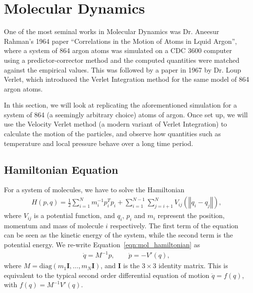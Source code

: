 \documentclass[../Main.tex]{subfiles}
\begin{document}
\section{Molecular Dynamics}

One of the most seminal works in Molecular Dynamics was Dr. Aneesur Rahman's 1964 paper \cite{Rahman1964} ``Correlations in the Motion of Atoms in Lquid Argon'', where a system of 864 argon atoms was simulated on a CDC 3600 computer using a predictor-corrector method and the computed quantities were matched against the empirical values. This was followed by a paper in 1967 \cite{Verlet1967} by Dr. Loup Verlet, which introduced the Verlet Integration method for the same model of 864 argon atoms.

In this section, we will look at replicating the aforementioned simulation for a system of 864 (a seemingly arbitrary choice) atoms of argon. Once set up, we will use the Velocity Verlet method (a modern variant of Verlet Integration) to calculate the motion of the particles, and observe how quantities such as temperature and local pressure behave over a long time period.


\subsection{Hamiltonian Equation}

For a system of molecules, we have to solve the Hamiltonian \cite{Harier2006}
\begin{align}
H(p, q) = \frac{1}{2}\sum_{i = 1}^{N} m_{i}^{-1}p_{i}^{T}p_{i} + \sum_{i=1}^{N-1} \sum_{j=i+1}^{N} V_{ij}\left(\left\Vert q_{i} - q_{j} \right\Vert\right), \label{eqn:mol_hamiltonian}
\end{align} where $V_{ij}$ is a potential function, and $q_{i}$, $p_{i}$ and $m_{i}$ represent the position, momentum and mass of molecule $i$ respectively.
The first term of the equation can be seen as the kinetic energy of the system, while the second term is the potential energy. We re-write Equation~\ref{eqn:mol_hamiltonian} as
\begin{align*}
\dot{q} = M^{-1}p, \quad \quad \dot{p} = -V'\left(q\right),
\end{align*} where $M = \mbox{diag}\left(m_{1}\textbf{I}, \ldots, m_{N}\textbf{I}\right)$, and \textbf{I} is the $3\times3$ identity matrix. This is equivalent to the typical second order differential equation of motion $\ddot{q} = f\left(q\right)$, with $f\left(q\right) = M^{-1}V'\left(q\right)$.
\end{document}
